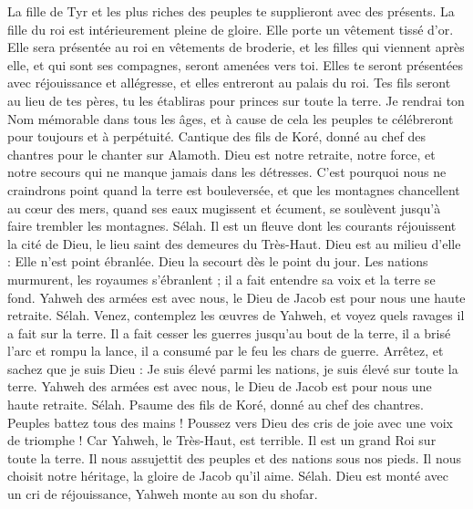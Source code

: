 \begin{multicols}{2}
La fille de Tyr et les plus riches des peuples te supplieront avec des présents.
La fille du roi est intérieurement pleine de gloire. Elle porte un vêtement tissé d'or.
Elle sera présentée au roi en vêtements de broderie, et les filles qui viennent après elle, et qui sont ses compagnes, seront amenées vers toi.
Elles te seront présentées avec réjouissance et allégresse, et elles entreront au palais du roi.
Tes fils seront au lieu de tes pères, tu les établiras pour princes sur toute la terre.
Je rendrai ton Nom mémorable dans tous les âges, et à cause de cela les peuples te célébreront pour toujours et à perpétuité.
\VerseOne{}Cantique des fils de Koré, donné au chef des chantres pour le chanter sur Alamoth. 
Dieu est notre retraite, notre force, et notre secours qui ne manque jamais dans les détresses.
C'est pourquoi nous ne craindrons point quand la terre est bouleversée, et que les montagnes chancellent au cœur des mers,
quand ses eaux mugissent et écument, se soulèvent jusqu'à faire trembler les montagnes. Sélah.
Il est un fleuve dont les courants réjouissent la cité de Dieu, le lieu saint des demeures du Très-Haut.
Dieu est au milieu d'elle : Elle n'est point ébranlée. Dieu la secourt dès le point du jour.
Les nations murmurent, les royaumes s'ébranlent ; il a fait entendre sa voix et la terre se fond.
Yahweh des armées est avec nous, le Dieu de Jacob est pour nous une haute retraite. Sélah.
Venez, contemplez les œuvres de Yahweh, et voyez quels ravages il a fait sur la terre.
Il a fait cesser les guerres jusqu'au bout de la terre, il a brisé l'arc et rompu la lance, il a consumé par le feu les chars de guerre.
Arrêtez, et sachez que je suis Dieu : Je suis élevé parmi les nations, je suis élevé sur toute la terre.
Yahweh des armées est avec nous, le Dieu de Jacob est pour nous une haute retraite. Sélah.
\VerseOne{}Psaume des fils de Koré, donné au chef des chantres.
Peuples battez tous des mains ! Poussez vers Dieu des cris de joie avec une voix de triomphe !
Car Yahweh, le Très-Haut, est terrible. Il est un grand Roi sur toute la terre.
Il nous assujettit des peuples et des nations sous nos pieds.
Il nous choisit notre héritage, la gloire de Jacob qu'il aime. Sélah.
Dieu est monté avec un cri de réjouissance, Yahweh monte au son du shofar.

\end{multicols}
